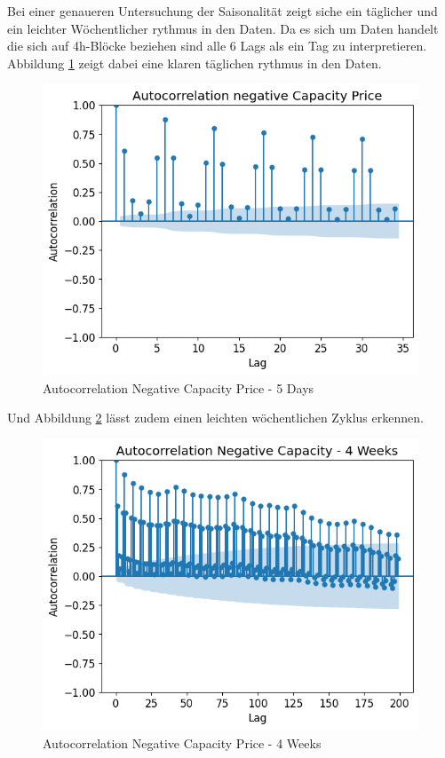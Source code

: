 Bei einer genaueren Untersuchung der Saisonalität zeigt siche ein täglicher und ein leichter Wöchentlicher rythmus in den Daten.
Da es sich um Daten handelt die sich auf 4h-Blöcke beziehen sind alle 6 Lags als ein Tag zu interpretieren.
Abbildung \ref{fig:Autocorrelation Negative Capacity Price - 5 Days} zeigt dabei eine klaren täglichen rythmus in den Daten.

\begin{figure}[!h]
	\includegraphics[width=0.7\linewidth]{pictures/Autocorrelation negative Capacity Price.png}
	\caption{Autocorrelation Negative Capacity Price - 5 Days}
	\label{fig:Autocorrelation Negative Capacity Price - 5 Days}
\end{figure}

Und Abbildung \ref{fig:AutocorrNegCap4Weeks} lässt zudem einen leichten wöchentlichen Zyklus erkennen.
\begin{figure}[!h]
	\includegraphics[width=0.7\linewidth]{pictures/Autocorrelation Negative Capacity - 4 Weeks.png}
	\caption{Autocorrelation Negative Capacity Price - 4 Weeks}
	\label{fig:AutocorrNegCap4Weeks}
\end{figure}

